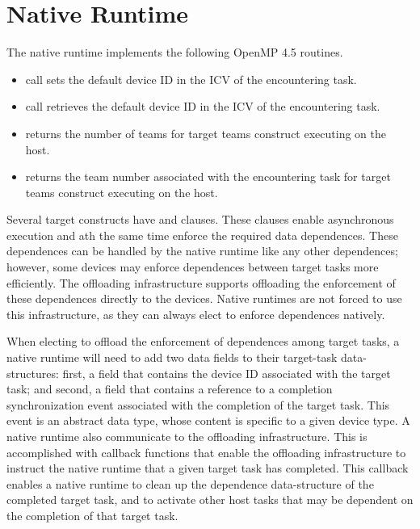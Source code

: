 \section{Native Runtime}

The native runtime implements the following OpenMP 4.5 routines.

\begin{itemize}
  \item {} call sets the default device ID in the ICV of the encountering task.

  \item {} call retrieves the default device ID in the ICV of the encountering task.
 
  \item {} returns the number of teams for target teams construct executing on the host.
  
  \item {} returns the team number associated with the encountering task for target teams construct executing on the host.
 
\end{itemize}

Several target constructs have  and  clauses. These clauses enable asynchronous execution and ath the same time enforce the required data dependences. These dependences can be handled by the native runtime like any other dependences; however, some devices may enforce dependences between target tasks more efficiently. The offloading infrastructure supports offloading the enforcement of these dependences directly to the devices. Native runtimes are not forced to use this infrastructure, as they can always elect to enforce dependences natively.

When electing to offload the enforcement of dependences among target tasks, a native runtime will need to add two data fields to their target-task data-structures: first,  a field that contains the device ID associated with the target task; and second, a field that contains a reference to a completion synchronization event associated with the completion of the target task. This event is an abstract data type, whose content is specific to a given device type. A native runtime also communicate to the offloading infrastructure. This is accomplished with callback functions that enable the offloading infrastructure to instruct the native runtime that a given target task has completed. This callback enables a native runtime to clean up the dependence data-structure of the completed target task, and to activate other host tasks that may be dependent on the completion of that target task.

